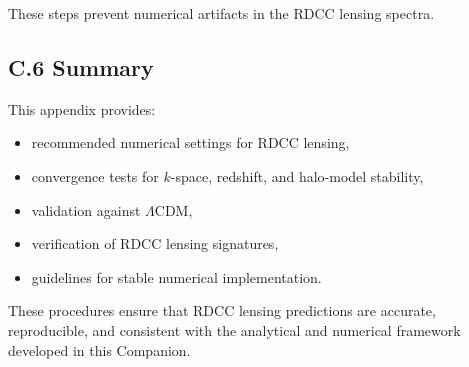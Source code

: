 \documentclass[11pt,a4paper]{article}
\begin{document}
These steps prevent numerical artifacts in the RDCC lensing spectra.

\subsection*{C.6 Summary}

This appendix provides:
\begin{itemize}
\item recommended numerical settings for RDCC lensing,
\item convergence tests for $k$-space, redshift, and halo-model stability,
\item validation against $\Lambda$CDM,
\item verification of RDCC lensing signatures,
\item guidelines for stable numerical implementation.
\end{itemize}

These procedures ensure that RDCC lensing predictions are accurate, reproducible, and
consistent with the analytical and numerical framework developed in this Companion.
\end{document}
